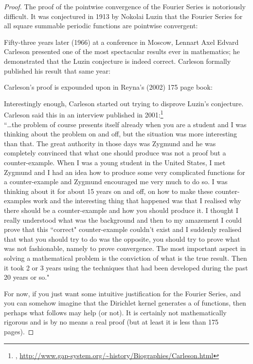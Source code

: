\begin{proof}
The proof of the pointwise convergence of the Fourier Series is notoriously difficult.
It was conjectured in 1913 by Nokolai Luzin that the Fourier Series for all square summable periodic functions 
are pointwise convergent:
\citePbullet\quad{}

Fifty-three years later (1966) at a conference in Moscow, Lennart Axel Edvard Carleson presented one of the most spectacular 
results ever in mathematics; he demonstrated that the Luzin conjecture is indeed correct.
Carleson formally published his result that same year:
\citePbullet\quad{}

Carleson's proof is expounded upon in Reyna's (2002) 175 page book:
\citebullet\quad{}

Interestingly enough, Carleson started out trying to disprove Luzin's conjecture.
Carleson said this in an interview published in 2001:\footnote{
  ,
  \url{http://www.gap-system.org/~history/Biographies/Carleson.html}
  }
\\
``\ldots the problem of course presents itself already when you are a student and I was thinking about the problem on and off, 
  but the situation was more interesting than that. 
  The great authority in those days was Zygmund and he was completely convinced that what one should produce was not a proof 
  but a counter-example. 
  When I was a young student in the United States, 
  I met Zygmund and I had an idea how to produce some very complicated functions for a counter-example 
  and Zygmund encouraged me very much to do so. 
  I was thinking about it for about 15 years on and off, on how to make these counter-examples work 
  and the interesting thing that happened was that I realised why there should be a counter-example and how you should produce it. 
  I thought I really understood what was the background and then to my amazement I could prove that 
  this ``correct" counter-example couldn't exist and I suddenly realised that what you should try to do was the opposite, 
  you should try to prove what was not fashionable, namely to prove convergence. 
  The most important aspect in solving a mathematical problem is the conviction of what is the true result. 
  Then it took 2 or 3 years using the techniques that had been developed during the past 20 years or so."

For now, if you just want some intuitive justification for the Fourier Series, 
and you can somehow imagine that the Dirichlet kernel generates a  of  functions,
then perhaps what follows may help (or not). It is certainly not mathematically rigorous and is by 
no means a real proof (but at least it is less than 175 pages).


\end{proof}
